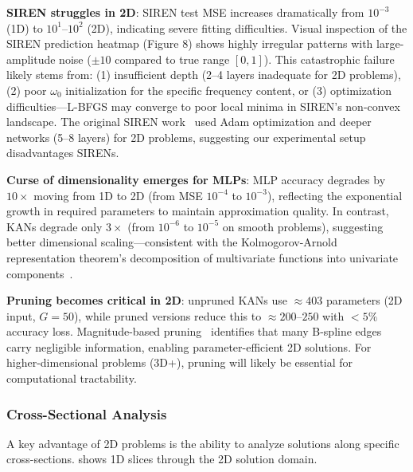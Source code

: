 \documentclass[11pt,a4paper]{article}
\begin{document}
\textbf{SIREN struggles in 2D}: SIREN test MSE increases dramatically from $10^{-3}$ (1D) to $10^{1}$--$10^{2}$ (2D), indicating severe fitting difficulties. Visual inspection of the SIREN prediction heatmap (Figure 8) shows highly irregular patterns with large-amplitude noise ($\pm 10$ compared to true range $[0, 1]$). This catastrophic failure likely stems from: (1) insufficient depth (2--4 layers inadequate for 2D problems), (2) poor $\omega_0$ initialization for the specific frequency content, or (3) optimization difficulties—L-BFGS may converge to poor local minima in SIREN's non-convex landscape. The original SIREN work~\citep{sitzmann2020implicit} used Adam optimization and deeper networks (5--8 layers) for 2D problems, suggesting our experimental setup disadvantages SIRENs.

\textbf{Curse of dimensionality emerges for MLPs}: MLP accuracy degrades by $10\times$ moving from 1D to 2D (from MSE $10^{-4}$ to $10^{-3}$), reflecting the exponential growth in required parameters to maintain approximation quality. In contrast, KANs degrade only $3\times$ (from $10^{-6}$ to $10^{-5}$ on smooth problems), suggesting better dimensional scaling—consistent with the Kolmogorov-Arnold representation theorem's decomposition of multivariate functions into univariate components~\citep{liu2024kan}.

\textbf{Pruning becomes critical in 2D}: unpruned KANs use $\approx 403$ parameters (2D input, $G=50$), while pruned versions reduce this to $\approx 200$--$250$ with $<5\%$ accuracy loss. Magnitude-based pruning~\citep{liu2024kan} identifies that many B-spline edges carry negligible information, enabling parameter-efficient 2D solutions. For higher-dimensional problems (3D+), pruning will likely be essential for computational tractability.

\subsubsection{Cross-Sectional Analysis}

A key advantage of 2D problems is the ability to analyze solutions along specific cross-sections.  shows 1D slices through the 2D solution domain.
\end{document}
